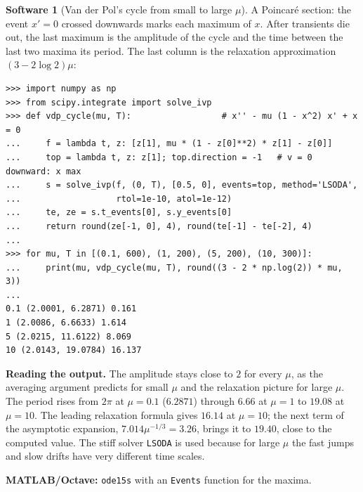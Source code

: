 \documentclass[11pt,a4paper]{article}
\numberwithin{equation}{section}
\theoremstyle{definition}
\newtheorem{software}[thm]{Software}
\begin{document}
\begin{software}[Van der Pol's cycle from small to large $\mu$]
\label{sw:vdp}
A Poincar\'e section: the event $x' = 0$ crossed downwards marks each maximum of $x$. After transients die out, the last maximum is the amplitude of the cycle and the time between the last two
maxima its period. The last column is the relaxation approximation $(3 - 2\log2)\mu$:
{\small\begin{verbatim}
>>> import numpy as np
>>> from scipy.integrate import solve_ivp
>>> def vdp_cycle(mu, T):                  # x'' - mu (1 - x^2) x' + x = 0
...     f = lambda t, z: [z[1], mu * (1 - z[0]**2) * z[1] - z[0]]
...     top = lambda t, z: z[1]; top.direction = -1   # v = 0 downward: x max
...     s = solve_ivp(f, (0, T), [0.5, 0], events=top, method='LSODA',
...                   rtol=1e-10, atol=1e-12)
...     te, ze = s.t_events[0], s.y_events[0]
...     return round(ze[-1, 0], 4), round(te[-1] - te[-2], 4)
...
>>> for mu, T in [(0.1, 600), (1, 200), (5, 200), (10, 300)]:
...     print(mu, vdp_cycle(mu, T), round((3 - 2 * np.log(2)) * mu, 3))
...
0.1 (2.0001, 6.2871) 0.161
1 (2.0086, 6.6633) 1.614
5 (2.0215, 11.6122) 8.069
10 (2.0143, 19.0784) 16.137
\end{verbatim}}
\textbf{Reading the output.} The amplitude stays close to $2$ for every $\mu$, as the averaging argument predicts for small $\mu$ and the relaxation picture for large $\mu$. The period rises from $2\pi$ at $\mu = 0.1$
($6.2871$) through $6.66$ at $\mu = 1$ to $19.08$ at $\mu = 10$. The leading relaxation formula gives $16.14$ at $\mu = 10$; the next term of the asymptotic expansion, $7.014\mu^{-1/3} = 3.26$, brings it to $19.40$, close
to the computed value. The stiff solver \texttt{LSODA} is used because for large $\mu$ the fast jumps and slow drifts have very different time scales.

\textbf{MATLAB/Octave:} \texttt{ode15s} with an \texttt{Events} function for the maxima.
\end{software}
\end{document}
